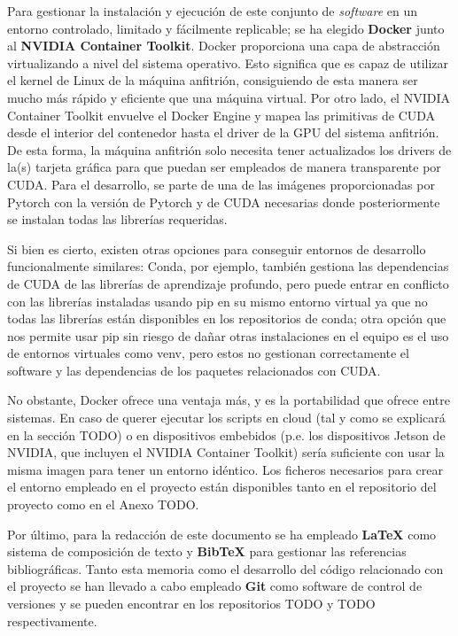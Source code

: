 Para gestionar la instalación y ejecución de este conjunto de \textit{software} en un entorno controlado, limitado y fácilmente replicable; se ha elegido \textbf{Docker} junto al \textbf{NVIDIA Container Toolkit}. Docker proporciona una capa de abstracción virtualizando a nivel del sistema operativo. Esto significa que es capaz de utilizar el kernel de Linux de la máquina anfitrión, consiguiendo de esta manera ser mucho más rápido y eficiente que una máquina virtual. Por otro lado, el NVIDIA Container Toolkit envuelve el Docker Engine y mapea las primitivas de CUDA desde el interior del contenedor hasta el driver de la GPU del sistema anfitrión. De esta forma, la máquina anfitrión solo necesita tener actualizados los drivers de la(s) tarjeta gráfica para que puedan ser empleados de manera transparente por CUDA. Para el desarrollo, se parte de una de las imágenes proporcionadas por Pytorch con la versión de Pytorch y de CUDA necesarias donde posteriormente se instalan todas las librerías requeridas. 

Si bien es cierto, existen otras opciones para conseguir entornos de desarrollo funcionalmente similares: Conda, por ejemplo, también gestiona las dependencias de CUDA de las librerías de aprendizaje profundo, pero puede entrar en conflicto con las librerías instaladas usando pip en su mismo entorno virtual ya que no todas las librerías están disponibles en los repositorios de conda; otra opción que nos permite usar pip sin riesgo de dañar otras instalaciones en el equipo es el uso de entornos virtuales como venv, pero estos no gestionan correctamente el software y las dependencias de los paquetes relacionados con CUDA. 

No obstante, Docker ofrece una ventaja más, y es la portabilidad que ofrece entre sistemas. En caso de querer ejecutar los scripts en cloud (tal y como se explicará en la sección TODO) o en dispositivos embebidos (p.e. los dispositivos Jetson de NVIDIA, que incluyen el NVIDIA Container Toolkit) sería suficiente con usar la misma imagen para tener un entorno idéntico. Los ficheros necesarios para crear el entorno empleado en el proyecto están disponibles tanto en el repositorio del proyecto como en el Anexo TODO.

Por último, para la redacción de este documento se ha empleado \textbf{LaTeX} como sistema de composición de texto y \textbf{BibTeX} para gestionar las referencias bibliográficas. Tanto esta memoria como el desarrollo del código relacionado con el proyecto se han llevado a cabo empleado \textbf{Git} como software de control de versiones y se pueden encontrar en los repositorios TODO y TODO respectivamente.

